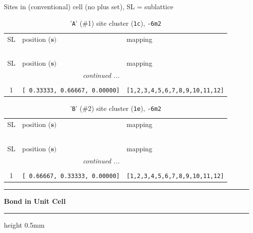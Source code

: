 \documentclass[fleqn,10pt,landscape]{jsarticle}
\begin{document}
\noindent Sites in (conventional) cell (no plus set), SL = sublattice

\renewcommand{\arraystretch}{1.6}
\begin{longtable}[l]{cll}
\captionsetup{justification=raggedright, singlelinecheck=off}
\caption{'\texttt{A}' (\#1) site cluster (\texttt{1c}), \texttt{-6m2}}
 \\
 \hline \hline
SL & position ($\bm{s})$ & mapping \\ \hline \endfirsthead

\multicolumn{2}{l}{\tablename\ \thetable{}} \\
 \hline \hline
SL & position ($\bm{s})$ & mapping \\ \hline \endhead

 \hline \hline
\multicolumn{2}{r}{\footnotesize\it continued ...} \\ \endfoot

 \hline \hline
\multicolumn{2}{r}{} \\ \endlastfoot

1 & \texttt{[ 0.33333, 0.66667, 0.00000]} & \texttt{[1,2,3,4,5,6,7,8,9,10,11,12]} \\
\end{longtable}
\renewcommand{\arraystretch}{1.6}
\begin{longtable}[l]{cll}
\captionsetup{justification=raggedright, singlelinecheck=off}
\caption{'\texttt{B}' (\#2) site cluster (\texttt{1e}), \texttt{-6m2}}
 \\
 \hline \hline
SL & position ($\bm{s})$ & mapping \\ \hline \endfirsthead

\multicolumn{2}{l}{\tablename\ \thetable{}} \\
 \hline \hline
SL & position ($\bm{s})$ & mapping \\ \hline \endhead

 \hline \hline
\multicolumn{2}{r}{\footnotesize\it continued ...} \\ \endfoot

 \hline \hline
\multicolumn{2}{r}{} \\ \endlastfoot

1 & \texttt{[ 0.66667, 0.33333, 0.00000]} & \texttt{[1,2,3,4,5,6,7,8,9,10,11,12]} \\
\end{longtable}
\vspace{5mm}
\noindent \rule[0.5mm]{5mm}{0.5mm}\hspace{3mm}\textbf{Bond in Unit Cell}\hspace{3mm}\leaders\hrule height 0.5mm\hfill\kern0pt
\vspace{3mm}
\end{document}
